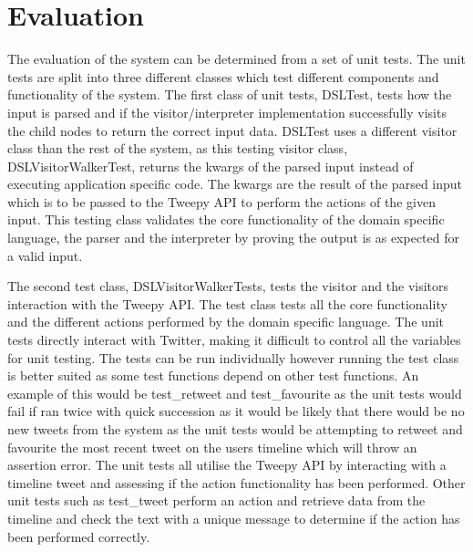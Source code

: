 \chapter{Evaluation}

The evaluation of the system can be determined from a set of unit tests. The unit tests are split into three different classes which test different components and functionality of the system. The first class of unit tests, DSLTest, tests how the input is parsed and if the visitor/interpreter implementation successfully visits the child nodes to return the correct input data. DSLTest uses a different visitor class than the rest of the system, as this testing visitor class, DSLVisitorWalkerTest, returns the kwargs of the parsed input instead of executing application specific code. The kwargs are the result of the parsed input which is to be passed to the Tweepy API to perform the actions of the given input. This testing class validates the core functionality of the domain specific language, the parser and the interpreter by proving the output is as expected for a valid input. \newline \par

The second test class, DSLVisitorWalkerTests, tests the visitor and the visitors interaction with the Tweepy API. The test class tests all the core functionality and the different actions performed by the domain specific language. The unit tests directly interact with Twitter, making it difficult to control all the variables for unit testing. The tests can be run individually however running the test class is better suited as some test functions depend on other test functions. An example of this would be test\_retweet and test\_favourite as the unit tests would fail if ran twice with quick succession as it would be likely that there would be no new tweets from the system as the unit tests would be attempting to retweet and favourite the most recent tweet on the users timeline which will throw an assertion error. The unit tests all utilise the Tweepy API by interacting with a timeline tweet and assessing if the action functionality has been performed. Other unit tests such as test\_tweet perform an action and retrieve data from the timeline and check the text with a unique message to determine if the action has been performed correctly. \newline \par

